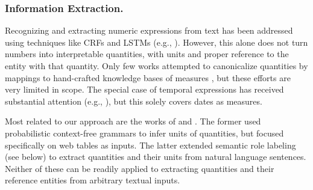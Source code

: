 \subsubsection{Information Extraction.}
Recognizing and extracting numeric expressions
from text has been addressed using
techniques like CRFs and LSTMs 
(e.g., \cite{DBLP:conf/aaai/MadaanMMRS16,DBLP:conf/acl/SahaPM17,DBLP:conf/sigir/AlonsoS18}).
However, this alone does not turn numbers
into interpretable quantities, with units
and proper reference to the entity with
that quantity. Only few works attempted
to canonicalize quantities by mappings
to hand-crafted knowledge bases 
of measures \cite{DBLP:conf/cikm/IbrahimRW16}, but these efforts are
very limited in scope.
The special case of temporal expressions
has received substantial attention
(e.g., \cite{DBLP:series/synthesis/2016Strotgen}), but this solely covers dates
as measures.

Most related to our approach are the works
of \cite{DBLP:conf/kdd/SarawagiC14} and \cite{DBLP:journals/tacl/RoyVR15}.
The former used probabilistic context-free grammars
to infer units of quantities, but focused specifically
on web tables as inputs.
The latter extended semantic role labeling (see below)
to extract quantities and their units from
natural language sentences.
Neither of these can be readily applied
to extracting quantities and their reference entities
from arbitrary textual inputs.
